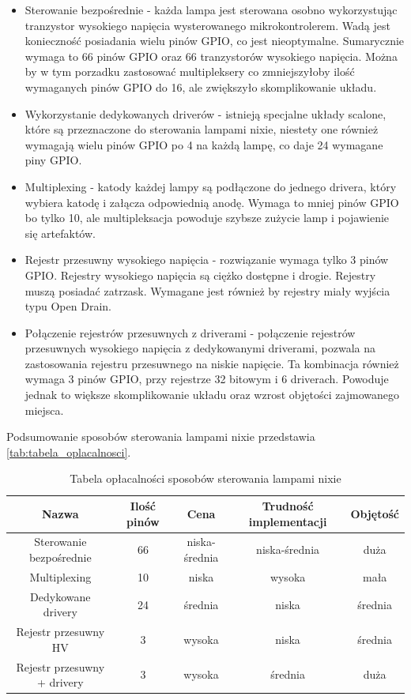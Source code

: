 \documentclass[../main.tex]{subfiles}
\begin{document}
\begin{itemize}
    \item Sterowanie bezpośrednie - każda lampa jest sterowana osobno wykorzystując tranzystor wysokiego napięcia wysterowanego mikrokontrolerem.
    Wadą jest konieczność posiadania wielu pinów GPIO, co jest nieoptymalne. Sumarycznie wymaga to 66 pinów GPIO oraz 66 tranzystorów wysokiego napięcia.
    Można by w tym porzadku zastosować multipleksery co zmniejszyłoby ilość wymaganych pinów GPIO do 16, ale zwiększyło skomplikowanie układu.
    \item Wykorzystanie dedykowanych driverów - istnieją specjalne układy scalone, które są przeznaczone do sterowania lampami nixie, niestety
    one również wymagają wielu pinów GPIO po 4 na każdą lampę, co daje 24 wymagane piny GPIO.
    \item Multiplexing - katody każdej lampy są podłączone do jednego drivera, który wybiera katodę i załącza odpowiednią anodę. 
    Wymaga to mniej pinów GPIO bo tylko 10, ale multipleksacja powoduje szybsze zużycie lamp i pojawienie się artefaktów.
    \item Rejestr przesuwny wysokiego napięcia - rozwiązanie wymaga tylko 3 pinów GPIO. Rejestry wysokiego napięcia są ciężko dostępne i drogie.
    Rejestry muszą posiadać zatrzask. Wymagane jest również by rejestry miały wyjścia typu Open Drain.
    \item Połączenie rejestrów przesuwnych z driverami - połączenie rejestrów przesuwnych wysokiego napięcia z dedykowanymi driverami, pozwala na zastosowania
    rejestru przesuwnego na niskie napięcie. Ta kombinacja również wymaga 3 pinów GPIO, przy rejestrze 32 bitowym i 6 driverach. Powoduje jednak to
    większe skomplikowanie układu oraz wzrost objętości zajmowanego miejsca.
\end{itemize}
Podsumowanie sposobów sterowania lampami nixie przedstawia \ref{tab:tabela_oplacalnosci}.
\begin{table}[H]
  \centering
  \begin{tabular}{|c|c|c|c|c|}
    \hline
    Nazwa & Ilość pinów & Cena & Trudność implementacji & Objętość\\
    \hline
    Sterowanie bezpośrednie & 66 & niska-średnia & niska-średnia & duża \\
    \hline
    Multiplexing & 10 &niska & wysoka & mała \\
    \hline
    Dedykowane drivery & 24 &średnia & niska & średnia \\
    \hline
    Rejestr przesuwny HV & 3 &wysoka & niska & średnia \\
    \hline
    Rejestr przesuwny + drivery & 3 & wysoka & średnia & duża \\
    \hline
  \end{tabular}
  \caption{Tabela opłacalności sposobów sterowania lampami nixie}
\end{table}
\end{document}

